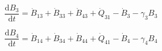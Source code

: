 \begin{equation} \label{eq:C-embodied_acct_3_depreciation}
	\frac{\mathrm{d}B_{3}}{\mathrm{d}t} 	 = \dot{B}_{13} + \dot{B}_{33} + \dot{B}_{43} + \dot{Q}_{31} - \dot{B}_{3} - \gamma_3 B_3
\end{equation}

\begin{equation} \label{eq:C-embodied_acct_4_depreciation}
	\frac{\mathrm{d}B_{4}}{\mathrm{d}t}	 = \dot{B}_{14} + \dot{B}_{34} + \dot{B}_{44} + \dot{Q}_{41} - \dot{B}_{4} - \gamma_4 B_4
\end{equation}

%
%
%
%
%
%
%
%
